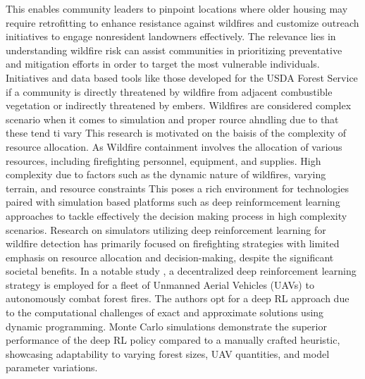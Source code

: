 \documentclass{scspaperproc}
\theoremstyle{scsthe}
\begin{document}
This enables community leaders to pinpoint locations where older housing may require retrofitting to enhance resistance against wildfires and customize outreach initiatives to engage nonresident landowners effectively.
The relevance lies in understanding wildfire risk can assist communities in prioritizing preventative and mitigation efforts in order to target the most vulnerable individuals.
Initiatives and data based tools like those developed for the USDA Forest Service if a community is directly threatened by wildfire from adjacent combustible vegetation or indirectly threatened by embers.
Wildfires are considered complex scenario when it comes to simulation and proper rource ahndling due to that these tend ti vary 
This research is motivated on the baisis of the complexity of resource allocation. As Wildfire containment involves the allocation of various resources, including firefighting personnel, equipment, and supplies. High complexity due to factors such as the dynamic nature of wildfires, varying terrain, and resource constraints
This poses a rich environment for technologies paired with simulation based platforms such as deep reinformcement learning approaches to tackle effectively the decision making process in high complexity scenarios. 
Research on simulators utilizing deep reinforcement learning for wildfire detection has primarily focused on firefighting strategies with limited emphasis on resource allocation and decision-making, despite the significant societal benefits. In a notable study \cite{haksar_distributed_2018}, a decentralized deep reinforcement learning strategy is employed for a fleet of Unmanned Aerial Vehicles (UAVs) to autonomously combat forest fires. The authors opt for a deep RL approach due to the computational challenges of exact and approximate solutions using dynamic programming. Monte Carlo simulations demonstrate the superior performance of the deep RL policy compared to a manually crafted heuristic, showcasing adaptability to varying forest sizes, UAV quantities, and model parameter variations.
\end{document}
